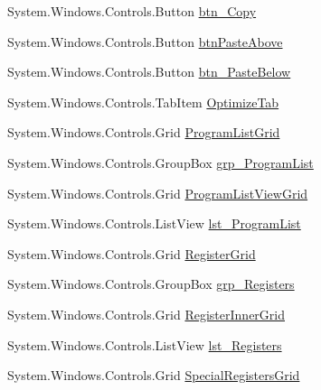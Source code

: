 \begin{DoxyCompactItemize}
\item 
System.\+Windows.\+Controls.\+Button \hyperlink{class_c_p_u___o_s___simulator_1_1_main_window_a55b2516a7b78d0e79deac7f1a79f3a92}{btn\+\_\+\+Copy}
\item 
System.\+Windows.\+Controls.\+Button \hyperlink{class_c_p_u___o_s___simulator_1_1_main_window_ae2ef9b73d0b5776415c7f3e91c1eaf21}{btn\+Paste\+Above}
\item 
System.\+Windows.\+Controls.\+Button \hyperlink{class_c_p_u___o_s___simulator_1_1_main_window_a1c24521ff648d75bf5991567e1a85b55}{btn\+\_\+\+Paste\+Below}
\item 
System.\+Windows.\+Controls.\+Tab\+Item \hyperlink{class_c_p_u___o_s___simulator_1_1_main_window_a47b1359d9e96abf2b0935eb3392405d4}{Optimize\+Tab}
\item 
System.\+Windows.\+Controls.\+Grid \hyperlink{class_c_p_u___o_s___simulator_1_1_main_window_adb8397cdbc794d18b0379ba7251d2278}{Program\+List\+Grid}
\item 
System.\+Windows.\+Controls.\+Group\+Box \hyperlink{class_c_p_u___o_s___simulator_1_1_main_window_a0ccd227c10c9a0878095ef10c0ff92b7}{grp\+\_\+\+Program\+List}
\item 
System.\+Windows.\+Controls.\+Grid \hyperlink{class_c_p_u___o_s___simulator_1_1_main_window_a4e287cef9f0becaebe0777af8de2d8c9}{Program\+List\+View\+Grid}
\item 
System.\+Windows.\+Controls.\+List\+View \hyperlink{class_c_p_u___o_s___simulator_1_1_main_window_ab33f21e0f19eab104e6f67f44d89daeb}{lst\+\_\+\+Program\+List}
\item 
System.\+Windows.\+Controls.\+Grid \hyperlink{class_c_p_u___o_s___simulator_1_1_main_window_a37acb139db0aa54950350fdb47dfd452}{Register\+Grid}
\item 
System.\+Windows.\+Controls.\+Group\+Box \hyperlink{class_c_p_u___o_s___simulator_1_1_main_window_af858add509dfe2b90f0d356822f73737}{grp\+\_\+\+Registers}
\item 
System.\+Windows.\+Controls.\+Grid \hyperlink{class_c_p_u___o_s___simulator_1_1_main_window_a27d2d9e2ed92e2daa444ca8086a0861e}{Register\+Inner\+Grid}
\item 
System.\+Windows.\+Controls.\+List\+View \hyperlink{class_c_p_u___o_s___simulator_1_1_main_window_ae88013c536662328670f206a4cab99b1}{lst\+\_\+\+Registers}
\item 
System.\+Windows.\+Controls.\+Grid \hyperlink{class_c_p_u___o_s___simulator_1_1_main_window_a7ce98e44f9236ca31eb5bf3ed81c3372}{Special\+Registers\+Grid}
\item 

\end{DoxyCompactItemize}
